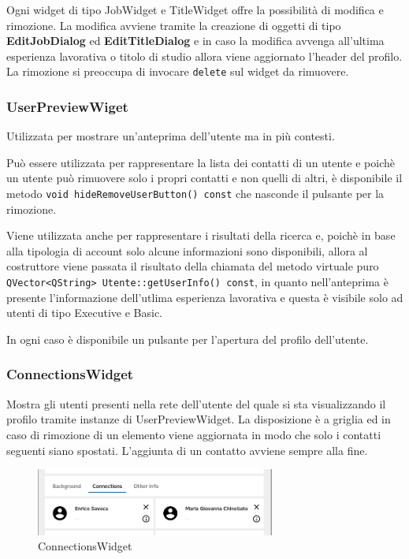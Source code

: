 \documentclass[a4paper]{article}
\begin{document}
Ogni widget di tipo JobWidget e TitleWidget offre la possibilità di modifica e rimozione. La modifica avviene tramite la creazione di oggetti di tipo \textbf{EditJobDialog} ed \textbf{EditTitleDialog} e in caso la modifica avvenga all'ultima esperienza lavorativa o titolo di studio allora viene aggiornato l'header del profilo. La rimozione si preoccupa di invocare \texttt{delete} sul widget da rimuovere.

\subsubsection*{UserPreviewWiget}
Utilizzata per mostrare un'anteprima dell'utente ma in più contesti.

Può essere utilizzata per rappresentare la lista dei contatti di un utente e poichè un utente può rimuovere solo i propri contatti e non quelli di altri, è disponibile il metodo \texttt{void hideRemoveUserButton() const} che nasconde il pulsante per la rimozione. 

Viene utilizzata anche per rappresentare i risultati della ricerca e, poichè in base alla tipologia di account solo alcune informazioni sono disponibili, allora al costruttore viene passata il risultato della chiamata del metodo virtuale puro \texttt{QVector<QString> Utente::getUserInfo() const}, in quanto nell'anteprima è presente l'informazione dell'utlima esperienza lavorativa e questa è visibile solo ad utenti di tipo Executive e Basic.

In ogni caso è disponibile un pulsante per l'apertura del profilo dell'utente.

\subsubsection*{ConnectionsWidget}
Mostra gli utenti presenti nella rete dell'utente del quale si sta visualizzando il profilo tramite instanze di UserPreviewWidget. La disposizione è a griglia ed in caso di rimozione di un elemento viene aggiornata in modo che solo i contatti seguenti siano spostati. L'aggiunta di un contatto avviene sempre alla fine.

\begin{figure}[!ht]
\centering
\includegraphics[width=0.7\textwidth]{ConnectionsWidget.png}
\caption{ConnectionsWidget}
\end{figure}
\end{document}
